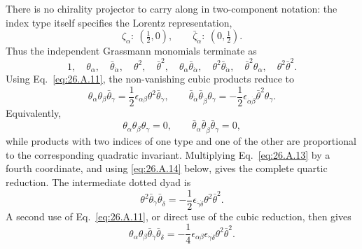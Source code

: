 There is no chirality projector to carry along in two-component notation:
the index type itself specifies the Lorentz representation,
\begin{equation}
  \zeta_\alpha:\ (\tfrac12,0),
  \qquad
  \bar\zeta_{\dot\alpha}:\ (0,\tfrac12).
  \tag{26.A.12}\label{eq:26.A.12}
\end{equation}
Thus the independent Grassmann monomials terminate as
\[
  1,\quad\theta_\alpha,\quad\bar\theta_{\dot\alpha},\quad
  \theta^2,\quad\bar\theta^2,\quad
  \theta_\alpha\bar\theta_{\dot\alpha},\quad
  \theta^2\bar\theta_{\dot\alpha},\quad
  \bar\theta^2\theta_\alpha,\quad
  \theta^2\bar\theta^2 .
\]
Using Eq.~\eqref{eq:26.A.11}, the non-vanishing cubic products reduce to
\begin{equation}
  \theta_\alpha\theta_\beta\bar\theta_{\dot\gamma}
  =\frac12\epsilon_{\alpha\beta}\theta^2
    \bar\theta_{\dot\gamma},
  \qquad
  \bar\theta_{\dot\alpha}\bar\theta_{\dot\beta}\theta_\gamma
  =-\frac12\epsilon_{\dot\alpha\dot\beta}\bar\theta^2\theta_\gamma .
  \tag{26.A.13}\label{eq:26.A.13}
\end{equation}
Equivalently,
\[
  \theta_\alpha\theta_\beta\theta_\gamma=0,
  \qquad
  \bar\theta_{\dot\alpha}\bar\theta_{\dot\beta}
    \bar\theta_{\dot\gamma}=0,
\]
while products with two indices of one type and one of the other are
proportional to the corresponding quadratic invariant.
Multiplying Eq.~\eqref{eq:26.A.13} by a fourth coordinate, and using
\eqref{eq:26.A.14} below, gives the complete quartic reduction.
The intermediate dotted dyad is
\begin{equation}
  \theta^2\bar\theta_{\dot\gamma}\bar\theta_{\dot\delta}
  =-\frac12\epsilon_{\dot\gamma\dot\delta}
    \theta^2\bar\theta^2 .
  \tag{26.A.14}\label{eq:26.A.14}
\end{equation}
A second use of Eq.~\eqref{eq:26.A.11}, or direct use of the cubic
reduction, then gives
\begin{equation}
  \theta_\alpha\theta_\beta
  \bar\theta_{\dot\gamma}\bar\theta_{\dot\delta}
  =-\frac14\epsilon_{\alpha\beta}
    \epsilon_{\dot\gamma\dot\delta}\theta^2\bar\theta^2 .
  \tag{26.A.15}\label{eq:26.A.15}
\end{equation}

